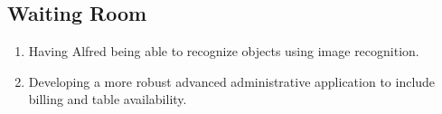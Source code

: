 \documentclass [11pt]{article}
\begin{document}
\subsection{Waiting Room}
	\begin{enumerate}[label=\textbf{(\roman*)}]
		\item Having Alfred being able to recognize objects using image recognition.
		\item Developing a more robust advanced administrative application to include billing and table availability.
	    \end{enumerate} 

\end{document}
